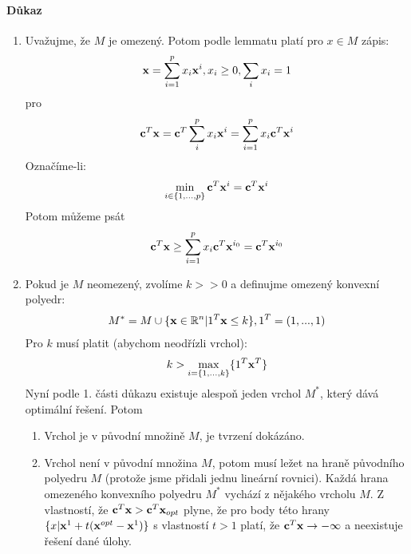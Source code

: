 \documentclass[a4paper,12pt,titlepage]{article}
\begin{document}
\paragraph{Důkaz}
\begin{enumerate}
	\item Uvažujme, že $M$ je omezený. Potom podle lemmatu platí pro $x \in M$
	zápis:
	\begin{align}
		\mathbf{x} = \sum_{i=1}^p x_i \mathbf{x}^i, x_i \ge 0, \sum_i x_i = 1
	\end{align}
	pro 
	\begin{align}
		\mathbf{c}^T \mathbf{x} = \mathbf{c}^T \sum_i^p x_i \mathbf{x}^i = \sum_{i=1}^p x_i \mathbf{c}^T \mathbf{x}^i
	\end{align}
	Označíme-li:
	\begin{align}
		\min_{i \in \{1, ..., p\}} \mathbf{c}^T \mathbf{x}^i = \mathbf{c}^T \mathbf{x}^i
	\end{align}
	Potom můžeme psát
	\begin{align}
		\mathbf{c}^T \mathbf{x} \ge \sum_{i=1}^p x_i \mathbf{c}^T \mathbf{x}^{i_0} = \mathbf{c}^T \mathbf{x}^{i_0}
	\end{align}
	\item Pokud je $M$ neomezený, zvolíme $k >> 0$ a definujme omezený konvexní
	polyedr:
	\begin{align}
		M^* = M \cup \{ \mathbf{x} \in \mathbb{R}^n | 1^T \mathbf{x} \le k \}, 1^T = (1, ..., 1)
	\end{align}
	Pro $k$ musí platit (abychom neodřízli vrchol):
	\begin{align}
		k > \max_{i=\{1,...,k\}} \{ 1^T \mathbf{x}^T \}
	\end{align}
	Nyní podle 1. části důkazu existuje alespoň jeden vrchol $M^*$, který dává
	optimální řešení. Potom
	\begin{enumerate}
		\item Vrchol je v původní množině $M$, je tvrzení dokázáno.
		\item Vrchol není v původní množina $M$, potom musí ležet na hraně
		původního polyedru $M$ (protože jsme přidali jednu lineární rovnici).
		Každá hrana omezeného konvexního polyedru $M^*$ vychází z nějakého
		vrcholu $M$. Z vlastností, že $\mathbf{c}^T \mathbf{x} > \mathbf{c}^T \mathbf{x}_{opt}$ plyne, že
		pro body této hrany $\{x | \mathbf{x}^1 + t(\mathbf{x}^{opt} - \mathbf{x}^1) \}$ s vlastností $t
		> 1$ platí, že $\mathbf{c}^T \mathbf{x} \to -\infty$ a neexistuje řešení dané úlohy.
	\end{enumerate}
\end{enumerate}
\end{document}

